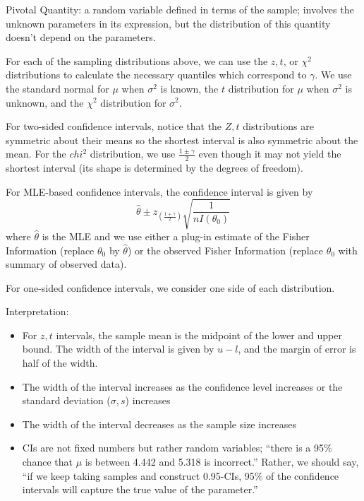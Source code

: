 \documentclass[letterpaper, 8pt]{extarticle}
\begin{document}
\begin{multicols*}{3}
    Pivotal Quantity: a random variable defined in terms of the sample; involves the unknown parameters in its expression, but the distribution of this quantity doesn't depend on the parameters.

    For each of the sampling distributions above, we can use the $z, t$, or $\chi^2$ distributions to calculate the necessary quantiles which correspond to $\gamma$. We use the standard normal for $\mu$ when $\sigma^2$ is known, the $t$ distribution for $\mu$ when $\sigma^2$ is unknown, and the $\chi^2$ distribution for $\sigma^2$. 
    
    For two-sided confidence intervals, notice that the $Z,t$ distributions are symmetric about their means so the shortest interval is also symmetric about the mean. For the $chi^2$ distribution, we use $\frac{1\pm\gamma}{2}$ even though it may not yield the shortest interval (its shape is determined by the degrees of freedom).

    For MLE-based confidence intervals, the confidence interval is given by
    \[\hat\theta\pm z_{(\frac{1+\gamma}{2})}\sqrt{\frac{1}{nI(\theta_0)}}\]
    where $\hat\theta$ is the MLE and we use either a plug-in estimate of the Fisher Information (replace $\theta_0$ by $\hat\theta$) or the observed Fisher Information (replace $\theta_0$ with summary of observed data).

    For one-sided confidence intervals, we consider one side of each distribution.

    Interpretation:
    \begin{itemize}
        \item For $z,t$ intervals, the sample mean is the midpoint of the lower and upper bound. The width of the interval is given by $u-l$, and the margin of error is half of the width.
        \item The width of the interval increases as the confidence level increases or the standard deviation ($\sigma,s$) increases
        \item The width of the interval decreases as the sample size increases
        \item CIs are not fixed numbers but rather random variables; ``there is a 95\% chance that $\mu$ is between 4.442 and 5.318 is incorrect.'' Rather, we should say, ``if we keep taking samples and construct 0.95-CIs, 95\% of the confidence intervals will capture the true value of the parameter.''
    \end{itemize}
\end{multicols*}
\end{document}
